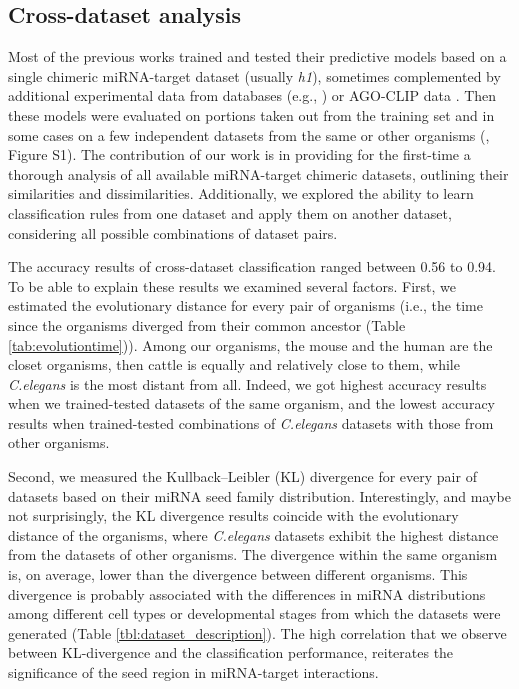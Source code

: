 \documentclass{bmcart}
\begin{document}
\subsection*{Cross-dataset analysis}
Most of the previous works trained and tested their predictive models based on a single chimeric miRNA-target dataset (usually \textit{h1}), sometimes complemented by additional experimental data from databases (e.g., \cite{xiao2009mirecords,chou2016mirtarbase}) or AGO-CLIP data \cite{ding2016tarpmir,wen2018deepmirtar,paker2019mirlstm, lu2016learning, pla2018miraw}. Then these models were evaluated on portions taken out from the training set and in some cases on a few independent datasets from the same or other organisms  (, Figure S1). 
The contribution of our work is in providing for the first-time a thorough analysis of all available miRNA-target chimeric datasets, outlining their similarities and dissimilarities. Additionally, we explored the ability to learn classification rules from one dataset and apply them on another dataset, considering all possible combinations of dataset pairs.

The accuracy results of cross-dataset classification ranged between 0.56 to 0.94. To be able to explain these results we examined several factors. First, we estimated the evolutionary distance for every pair of organisms (i.e., the time since the organisms diverged from their common ancestor (Table \ref{tab:evolutiontime})). Among our organisms, the mouse and the human are the closet organisms, then cattle is equally and relatively close to them, while \textit{C.elegans} is the most distant from all. Indeed, we got highest accuracy results when we trained-tested datasets of the same organism, and the lowest accuracy results when trained-tested combinations of \textit{C.elegans} datasets with those from other organisms.

Second, we measured the Kullback–Leibler (KL) divergence for every pair of datasets based on their miRNA seed family distribution. Interestingly, and maybe not surprisingly, the KL divergence results coincide with the evolutionary distance of the organisms, where \textit{C.elegans} datasets exhibit the highest distance from the datasets of other organisms. The divergence within the same organism is, on average, lower than the divergence between different organisms. This divergence is probably associated with the differences in miRNA distributions among different cell types or developmental stages from which the datasets were generated (Table \ref{tbl:dataset_description}). The high correlation that we observe between KL-divergence and the classification performance, reiterates the significance of the seed region in miRNA-target interactions.
\end{document}
